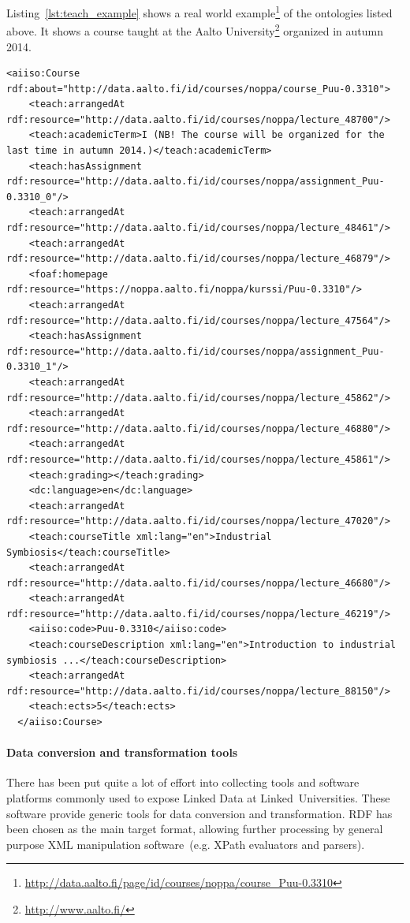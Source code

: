 \documentclass{article}
\begin{document}
Listing~\ref{lst:teach_example} shows a real world example\footnote{\url{http://data.aalto.fi/page/id/courses/noppa/course_Puu-0.3310}} of the ontologies listed above. 
It shows a course taught at the Aalto University\footnote{\url{http://www.aalto.fi/}} organized in autumn 2014. 
\begin{lstlisting}[caption={RDF/XML representation of an educational course for industrial symbiosis and industrial ecology concepts taught at the Aalto University using ontologies proposed at Linked Universities},label={lst:teach_example}]
  <aiiso:Course rdf:about="http://data.aalto.fi/id/courses/noppa/course_Puu-0.3310">
    <teach:arrangedAt rdf:resource="http://data.aalto.fi/id/courses/noppa/lecture_48700"/>
    <teach:academicTerm>I (NB! The course will be organized for the last time in autumn 2014.)</teach:academicTerm>
    <teach:hasAssignment rdf:resource="http://data.aalto.fi/id/courses/noppa/assignment_Puu-0.3310_0"/>
    <teach:arrangedAt rdf:resource="http://data.aalto.fi/id/courses/noppa/lecture_48461"/>
    <teach:arrangedAt rdf:resource="http://data.aalto.fi/id/courses/noppa/lecture_46879"/>
    <foaf:homepage rdf:resource="https://noppa.aalto.fi/noppa/kurssi/Puu-0.3310"/>
    <teach:arrangedAt rdf:resource="http://data.aalto.fi/id/courses/noppa/lecture_47564"/>
    <teach:hasAssignment rdf:resource="http://data.aalto.fi/id/courses/noppa/assignment_Puu-0.3310_1"/>
    <teach:arrangedAt rdf:resource="http://data.aalto.fi/id/courses/noppa/lecture_45862"/>
    <teach:arrangedAt rdf:resource="http://data.aalto.fi/id/courses/noppa/lecture_46880"/>
    <teach:arrangedAt rdf:resource="http://data.aalto.fi/id/courses/noppa/lecture_45861"/>
    <teach:grading></teach:grading>
    <dc:language>en</dc:language>
    <teach:arrangedAt rdf:resource="http://data.aalto.fi/id/courses/noppa/lecture_47020"/>
    <teach:courseTitle xml:lang="en">Industrial Symbiosis</teach:courseTitle>
    <teach:arrangedAt rdf:resource="http://data.aalto.fi/id/courses/noppa/lecture_46680"/>
    <teach:arrangedAt rdf:resource="http://data.aalto.fi/id/courses/noppa/lecture_46219"/>
    <aiiso:code>Puu-0.3310</aiiso:code>
    <teach:courseDescription xml:lang="en">Introduction to industrial symbiosis ...</teach:courseDescription>
    <teach:arrangedAt rdf:resource="http://data.aalto.fi/id/courses/noppa/lecture_88150"/>
    <teach:ects>5</teach:ects>
  </aiiso:Course>
\end{lstlisting}

\paragraph{Data conversion and transformation tools}
There has been put quite a lot of effort into collecting tools and software platforms commonly used to expose Linked Data at Linked~Universities. 
These software provide generic tools for data conversion and transformation. RDF has been chosen as the main target format, allowing further processing by general purpose XML manipulation software~(e.g. XPath evaluators and parsers).
\end{document}
